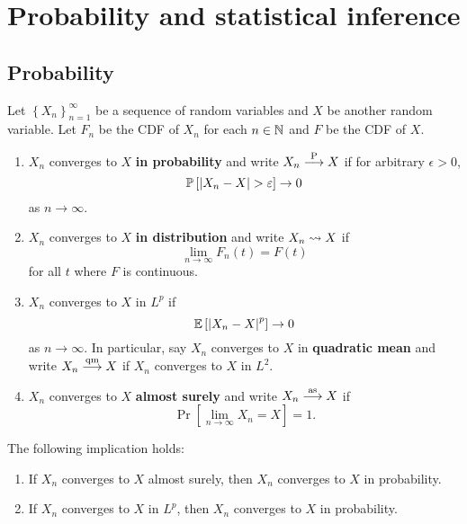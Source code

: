 \documentclass[a4paper]{article}
\begin{document}
\maketitle

\tableofcontents

\section{Probability and statistical inference}

\subsection{Probability}
\begin{defi}
Let $\left\{ X_n \right\}_{n=1}^\infty$ be a sequence of random
variables and $X$ be another random variable. Let 
$F_n$ be the CDF of $X_n$ for each $n \in \mathbb{N}$ and $F$ 
be the CDF of $X$. 
\begin{enumerate}
  \item $X_n$ converges to $X$ \textbf{in probability} 
  and write $X_n \overset{\mathrm{P}}{\longrightarrow} X$ if for arbitrary 
  $\epsilon > 0$, 
  \[
  \mathbb{P} \left[ \left\lvert X_n - X\right\rvert > \varepsilon \right] \to 0
  \]
  as $n \to \infty$.

  \item $X_n$ converges to $X$ \textbf{in distribution} and 
  write $X_n \rightsquigarrow X$ if 
  \[
  \lim_{n \to \infty} F_n(t) = F(t)
  \]
  for all $t$ where $F$ is continuous.
  
  \item $X_n$ converges to $X$ in $L^p$ if 
  \[
  \mathbb{E} \left[ \left\lvert X_n - X\right\rvert^p \right] \to 0
  \]
  as $n \to \infty$. In particular, say $X_n$ converges to 
  $X$ in \textbf{quadratic mean} and write $X_n \overset{\mathrm{qm}}{\longrightarrow} X$
  if $X_n$ converges to $X$ in $L^2$.

  \item $X_n$ converges to $X$ \textbf{almost surely} 
  and write $X_n \overset{\mathrm{as}}{\longrightarrow} X$ if 
  \[
  \Pr \left[ \lim_{n \to \infty} X_n =  X \right] = 1. 
  \]
\end{enumerate}
\end{defi}

\begin{thm}
The following implication holds:
\begin{enumerate}
  \item If $X_n$ converges to $X$ almost surely, 
  then $X_n$ converges to $X$ in probability. 
  
  \item If $X_n$ converges to $X$ in $L^p$, then 
  $X_n$ converges to $X$ in probability.
\end{enumerate}
\end{thm}
\end{document}
